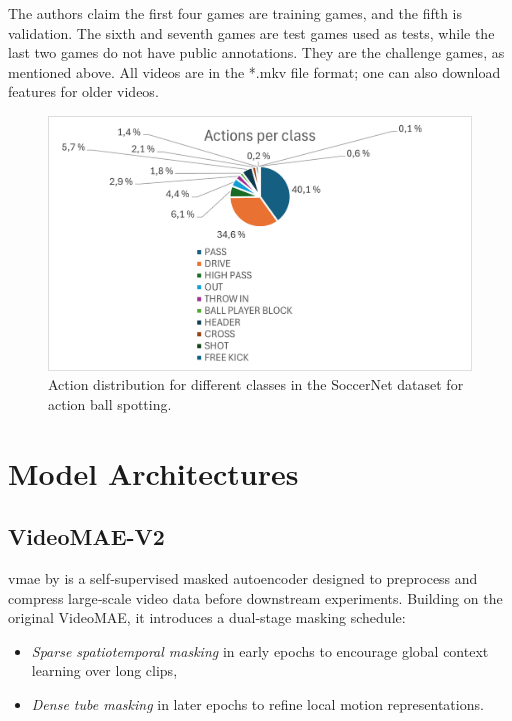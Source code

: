 The authors claim the first four games are training games, and the fifth is validation. The sixth and seventh games are test games used as tests, while the last two games do not have public annotations. They are the challenge games, as mentioned above. All videos are in the *.mkv file format; one can also download features for older videos. 

\begin{figure}
    \centering
    \includegraphics[width=1\linewidth]{figures/actions_per_class.png}
    \caption{Action distribution for different classes in the SoccerNet dataset for action ball spotting.}
    \label{fig:soccernet_dist}
\end{figure}


\section{Model Architectures}
\label{sec:model_architectures}

\subsection{VideoMAE-V2}
\label{ssec:videomae_v2}

\acrfull{vmae} by \textcite{wang_videomae_2023} is a self‑supervised masked autoencoder designed to preprocess and compress large‑scale video data before downstream experiments. Building on the original VideoMAE, it introduces a dual‑stage masking schedule: 

\begin{itemize}
    \item \emph{Sparse spatiotemporal masking} in early epochs to encourage global context learning over long clips,
    \item \emph{Dense tube masking} in later epochs to refine local motion representations.
\end{itemize}

